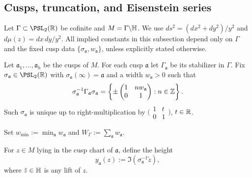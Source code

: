 
\subsection{Cusps, truncation, and Eisenstein series}\label{subsec:cusps}

Let $\Gamma\subset\PSL_2(\R)$ be cofinite and $M=\Gamma\backslash\mathbb{H}$.
We use $ds^2=(dx^2+dy^2)/y^2$ and $d\mu(z)=dx\,dy/y^2$.
All implied constants in this subsection depend only on $\Gamma$ and the fixed cusp data
$\{\sigma_{\mathfrak a},w_{\mathfrak a}\}$, unless explicitly stated otherwise.

Let $\mathfrak a_1,\dots,\mathfrak a_h$ be the cusps of $M$.
For each cusp $\mathfrak a$ let $\Gamma_{\mathfrak a}$ be its stabilizer in $\Gamma$.
Fix $\sigma_{\mathfrak a}\in\PSL_2(\R)$ with $\sigma_{\mathfrak a}(\infty)=\mathfrak a$
and a width $w_{\mathfrak a}>0$ such that
\begin{equation}\label{eq:scaling-conj}
\sigma_{\mathfrak a}^{-1}\Gamma_{\mathfrak a}\sigma_{\mathfrak a}
=
\left\{
\pm\begin{pmatrix}1& n w_{\mathfrak a}\\ 0&1\end{pmatrix} : n\in\mathbb{Z}
\right\}.
\end{equation}
Such $\sigma_{\mathfrak a}$ is unique up to right-multiplication by
$\bigl(\begin{smallmatrix}1&t\\0&1\end{smallmatrix}\bigr)$, $t\in\mathbb{R}$.

Set $w_{\min}:=\min_{\mathfrak a} w_{\mathfrak a}$ and $W_{\Gamma}:=\sum_{\mathfrak a} w_{\mathfrak a}$.

For $z\in M$ lying in the cusp chart of $\mathfrak a$, define the height
\begin{equation}\label{eq:height-function}
y_{\mathfrak a}(z):=\Im(\sigma_{\mathfrak a}^{-1}\tilde z),
\end{equation}
where $\tilde z\in\mathbb{H}$ is any lift of $z$.


